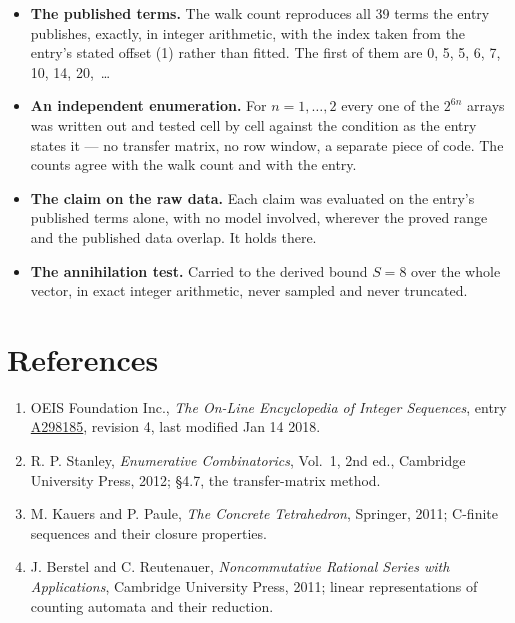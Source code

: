 \documentclass[11pt]{article}
\theoremstyle{definition}
\begin{document}
\begin{itemize}

\item {\bfseries The published terms.} The walk count reproduces all 39 terms the entry publishes, exactly, in integer arithmetic, with the index taken from the entry's stated offset (1) rather than fitted. The first of them are 0, 5, 5, 6, 7, 10, 14, 20,~\dots

\item {\bfseries An independent enumeration.} For $n = 1,\dots,2$ every one of the $2^{6n}$ arrays was written out and tested cell by cell against the condition as the entry states it --- no transfer matrix, no row window, a separate piece of code. The counts agree with the walk count and with the entry.

\item {\bfseries The claim on the raw data.} Each claim was evaluated on the entry's published terms alone, with no model involved, wherever the proved range and the published data overlap. It holds there.

\item {\bfseries The annihilation test.} Carried to the derived bound $S = 8$ over the whole vector, in exact integer arithmetic, never sampled and never truncated.

\end{itemize}

\section{References}

\begin{enumerate}

\item OEIS Foundation Inc., \emph{The On-Line Encyclopedia of Integer Sequences}, entry \href{https://oeis.org/A298185}{A298185}, revision 4, last modified Jan 14 2018.

\item R. P. Stanley, \emph{Enumerative Combinatorics}, Vol.~1, 2nd ed., Cambridge University Press, 2012; \S4.7, the transfer-matrix method.

\item M. Kauers and P. Paule, \emph{The Concrete Tetrahedron}, Springer, 2011; C-finite sequences and their closure properties.

\item J. Berstel and C. Reutenauer, \emph{Noncommutative Rational Series with Applications}, Cambridge University Press, 2011; linear representations of counting automata and their reduction.

\end{enumerate}
\end{document}
